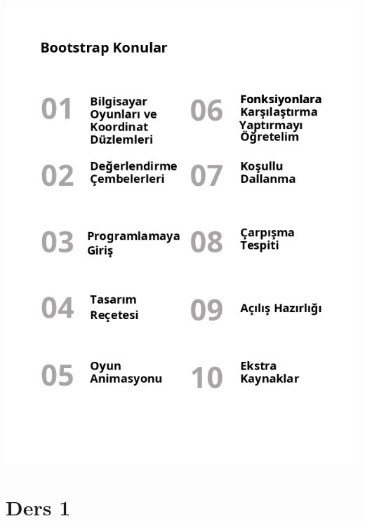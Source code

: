 \documentclass[12pt, a4paper]{article}
\begin{document}
\newpage
\includegraphics[width=1\linewidth]{StudentWorkbook_algebra_cover_tr_0-1.png}
\newpage
\section*{Ders 1}
\end{document}
